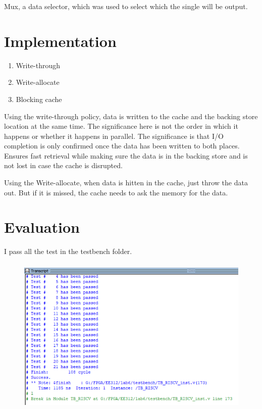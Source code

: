 \documentclass[12pt,a4paper]{article}
\begin{document}
Mux, a data selector, which was used to select which the single will be output.


\newpage

\section{Implementation}

\begin{enumerate}
  \item Write-through
  \item Write-allocate
  \item Blocking cache
  \end{enumerate}

Using the write-through policy, data is written to the cache and the backing store location at the same time. 
The significance here is not the order in which it happens or whether it happens in parallel. 
The significance is that I/O completion is only confirmed once the data has been written to both 
places.
Ensures fast retrieval while making sure the data is in the backing store and is not lost in case the cache is disrupted.

Using the Write-allocate, when data is hitten in the cache, just throw the data out.
But if it is missed, the cache needs to ask the memory for the data.


\newpage

\section{Evaluation}

I pass all the test in the testbench folder.

\begin{figure}[H]
  \centering
  \includegraphics[height=3in]{inst.PNG}
  \end{figure}
\end{document}
